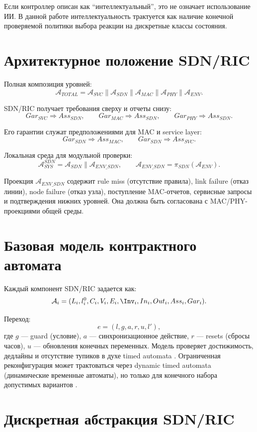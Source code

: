 \documentclass[10pt,a4paper]{article}
\newcommand{\A}[1]{\mathcal{A}_{#1}}
\newcommand{\Env}{\mathcal{A}_{ENV}}
\begin{document}
Если контроллер описан как ``интеллектуальный'', это не означает использование ИИ. В данной работе интеллектуальность трактуется как наличие конечной проверяемой политики выбора реакции на дискретные классы состояния.

\section{Архитектурное положение SDN/RIC}

Полная композиция уровней:
\[
\A{TOTAL}=\A{SVC}\parallel \A{SDN}\parallel \A{MAC}\parallel \A{PHY}\parallel \Env.
\]

SDN/RIC получает требования сверху и отчеты снизу:
\[
Gar_{SVC}\Rightarrow Ass_{SDN},\qquad
Gar_{MAC}\Rightarrow Ass_{SDN},\qquad
Gar_{PHY}\Rightarrow Ass_{SDN}.
\]

Его гарантии служат предположениями для MAC и service layer:
\[
Gar_{SDN}\Rightarrow Ass_{MAC},\qquad
Gar_{SDN}\Rightarrow Ass_{SVC}.
\]

Локальная среда для модульной проверки:
\[
\A{SYS}^{SDN}=\A{SDN}\parallel \A{ENV\_SDN},
\qquad
\A{ENV\_SDN}=\pi_{SDN}(\Env).
\]

Проекция \(\A{ENV\_SDN}\) содержит rule miss (отсутствие правила), link failure (отказ линии), node failure (отказ узла), поступление MAC-отчетов, сервисные запросы и подтверждения нижних уровней. Она должна быть согласована с MAC/PHY-проекциями общей среды.

\section{Базовая модель контрактного автомата}

Каждый компонент SDN/RIC задается как:
\[
\A{i}=(L_i,l_i^0,C_i,V_i,E_i,\Inv_i,In_i,Out_i,Ass_i,Gar_i).
\]

Переход:
\[
e=(l,g,a,r,u,l'),
\]
где \(g\) --- guard (условие), \(a\) --- синхронизационное действие, \(r\) --- resets (сбросы часов), \(u\) --- обновления конечных переменных. Модель проверяет достижимость, дедлайны и отсутствие тупиков в духе timed automata \cite{alur_dill}. Ограниченная реконфигурация может трактоваться через dynamic timed automata (динамические временные автоматы), но только для конечного набора допустимых вариантов \cite{tigane_dta}.

\section{Дискретная абстракция SDN/RIC}
\end{document}
